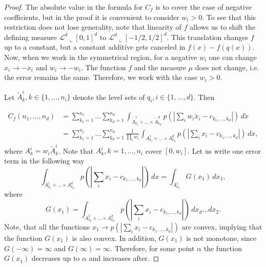 \documentclass{amsart}
\theoremstyle{remark}
\numberwithin{equation}{section}
\numberwithin{figure}{section}
\newcommand{\res}{\llcorner}
\begin{document}
\begin{proof} The absolute value in the formula for $C_f$ is to cover the case of negative coefficients, but in the proof it is convenient to consider $w_i > 0$. To see that this restriction does not lose generality, note that linearity of $f$ allows us to shift the defining measure $\mathcal{L}^d\res[0, 1]^d$ to $\mathcal{L}^d\res[-1/2, 1/2]^d$. This translation changes $f$ up to a constant, but a constant additive gets canceled in $f(x) - f(q(x))$. Now, when we work in the symmetrical region, for a negative $w_i$ one can change $x_i \to -x_i$ and $w_i \to -w_i$. The function $f$ and the measure $\mu$ does not change, i.e. the error remains the same. Therefore, we work with the case $w_i > 0$.

	Let $\tilde A^i_k, k \in \{1, \ldots, n_i\}$ denote the level sets of $q_i, i \in \{1, \ldots, d\}$. Then
	
\begin{align*}
	C_f(n_1, \ldots, n_d) &= \sum_{k_1 = 1}^{n_1} \ldots \sum_{k_d = 1}^{n_d} \int_{\tilde{A}_{k_1}^1\times\ldots \times \tilde{A}_{k_d}^d} p(|\sum_i w_i \tilde x_i-c_{k_1, \ldots, k_d}|)\, d\tilde x \\
	&=  \sum_{k_1 = 1}^{n_1} \ldots \sum_{k_d = 1}^{n_d}\frac{1}{\prod_i w_i} \int_{A_{k_1}^1\times\ldots \times A_{k_d}^d} p(|\sum_i x_i -c_{k_1, \ldots, k_d}|)\, d x,                                        
\end{align*}	 
	where $A_k^i = w_i \tilde A_k^i$. Note that $A_k^i, k = 1, \ldots, n_i$ cover $[0, w_i]$. Let us write one error term in the following way
	\[
	\int_{A_{k_1}^1\times\ldots \times A_{k_d}^d} p(|\sum_i x_i -c_{k_1, \ldots, k_d}|)\, d x
	= \int_{A_{k_1}^1} G(x_1)\, d x_1,
	\]
	where
	\[
	G(x_1) = \int_{A_{k_2}^2\times\ldots \times A_{k_d}^d}  p(|\sum_i x_i -c_{k_1, \ldots, k_d}|)\, dx_d \ldots dx_2.
	\]
	Note, that all the functions $x_1 \to p(|\sum_i x_i -c_{k_1, \ldots, k_d}|)$ are convex, implying that the function $G(x_1)$ is also convex. In addition, $G(x_1)$ is not monotone, since $G(-\infty)=\infty$ and $G(\infty)=\infty$. Therefore, for some point $\alpha$ the function $G(x_1)$ decreases up to $\alpha$ and increases after. 
	

\end{proof}
\end{document}
